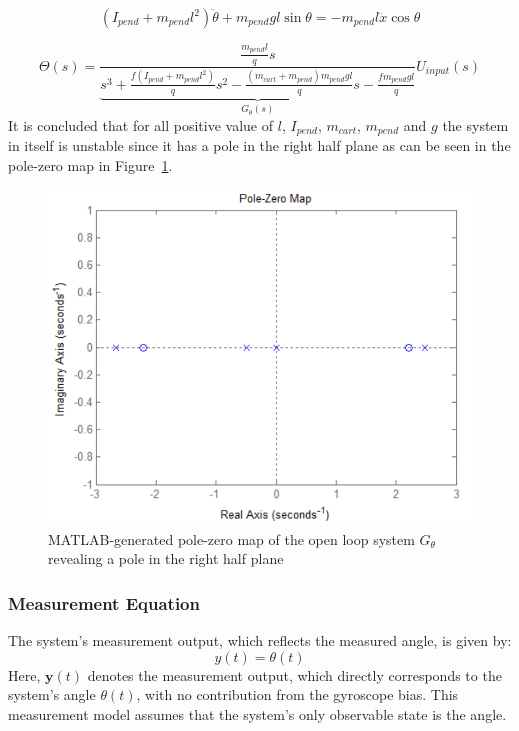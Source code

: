 \begin{equation}
	(I_{pend} + m_{pend} l^2) \ddot{\theta} + m_{pend} g l \sin \theta = -m_{pend} l \ddot{x} \cos \theta \label{eq:combined_torque}
\end{equation}

\begin{equation}
	\Theta(s) = \underbrace{\frac{\frac{m_{pend} l}{q} s}{s^3 + \frac{f(I_{pend} + m_{pend} l^2)}{q} s^2 - \frac{(m_{cart} + m_{pend}) m_{pend} g l}{q} s - \frac{f m_{pend} g l}{q}}}_{G_\theta(s)} U_{input}(s) \label{eq:transfer_function_psi}
\end{equation}
It is concluded that for all positive value of $l$, $I_{pend}$, $m_{cart}$, $m_{pend}$ and $g$ the system in itself is unstable since it has a pole in the right half plane as can be seen in the pole-zero map in Figure~\ref{fig:pole-zero-map}.

\begin{figure}
	\centering
	\includegraphics[width=0.7\linewidth]{assets/pole-zero-map}
	\caption{MATLAB-generated pole-zero map of the open loop system $G_{\theta}$ revealing a pole in the right half plane}
	\label{fig:pole-zero-map}
\end{figure}


\subsubsection{Measurement Equation} 
The system's measurement output, which reflects the measured angle, is given by:
\begin{equation}
	{y}(t) = \theta(t) \label{eq:measurement_eq}
\end{equation}
Here, $\mathbf{y}(t)$ denotes the measurement output, which directly corresponds to the system’s angle $\theta(t)$, with no contribution from the gyroscope bias. This measurement model assumes that the system's only observable state is the angle.



